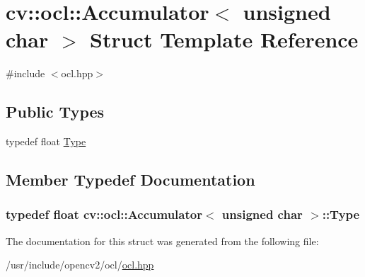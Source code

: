 \hypertarget{structcv_1_1ocl_1_1Accumulator_3_01unsigned_01char_01_4}{\section{cv\-:\-:ocl\-:\-:Accumulator$<$ unsigned char $>$ Struct Template Reference}
\label{structcv_1_1ocl_1_1Accumulator_3_01unsigned_01char_01_4}
}


{\ttfamily \#include $<$ocl.\-hpp$>$}

\subsection*{Public Types}
\begin{DoxyCompactItemize}
\item 
typedef float \hyperlink{structcv_1_1ocl_1_1Accumulator_3_01unsigned_01char_01_4_a655f3a03814296efd2cf49258aafbcd4}{Type}
\end{DoxyCompactItemize}


\subsection{Member Typedef Documentation}
\hypertarget{structcv_1_1ocl_1_1Accumulator_3_01unsigned_01char_01_4_a655f3a03814296efd2cf49258aafbcd4}{
\subsubsection[{Type}]{\setlength{\rightskip}{0pt plus 5cm}typedef float {\bf cv\-::ocl\-::\-Accumulator}$<$ unsigned char $>$\-::{\bf Type}}}\label{structcv_1_1ocl_1_1Accumulator_3_01unsigned_01char_01_4_a655f3a03814296efd2cf49258aafbcd4}


The documentation for this struct was generated from the following file\-:\begin{DoxyCompactItemize}
\item 
/usr/include/opencv2/ocl/\hyperlink{ocl_2ocl_8hpp}{ocl.\-hpp}\end{DoxyCompactItemize}
